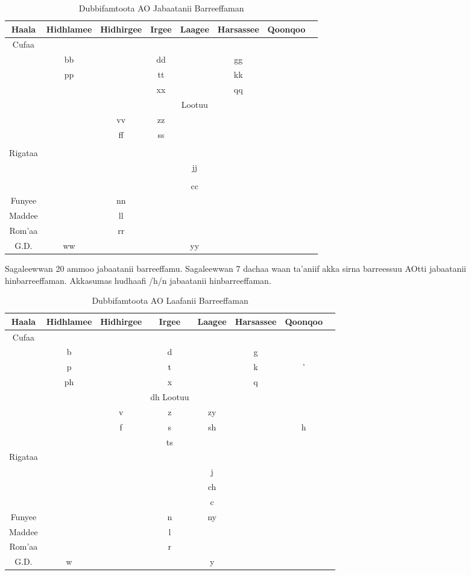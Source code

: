 \documentclass[11pt,b5paper]{book}
\begin{document}
\begin{table}[h!]
	\centering
	\caption{Dubbifamtoota AO Jabaatanii Barreeffaman}
	\begin{tabular}{c |c c c c c c c}
		\hline
		Haala & Hidhlamee & Hidhirgee & Irgee & Laagee & Harsassee & Qoonqoo \\
		\hline
		Cufaa \\
		 & bb & & dd & & gg & & \\
		 & pp & & tt & & kk & & \\
		 & & & xx & & qq & & \\
		 & & & &\cr
		\hline
		Lootuu \\
		 & & vv & zz & & \\
		 &  & ff & ss & & & &  \\
		 & & & &\\
		\hline
		Rigataa \\
		 & & & & jj \\
		 & & & & &\\
		 & & & & cc\\
		\hline
		Funyee & & nn \\
		\hline
		Maddee & & ll\\
		\hline
		Rom'aa & & rr\\
		\hline
		G.D. & ww & & & yy\\
		\hline		
	\end{tabular}
\end{table}

Sagaleewwan 20 ammoo jabaatanii barreeffamu. Sagaleewwan 7 dachaa waan ta'aniif akka sirna barreessuu AOtti jabaatanii hinbarreeffaman. Akkasumas hudhaafi /h/n jabaatanii hinbarreeffaman.

\begin{table}[h!]	
	\caption{Dubbifamtoota AO Laafanii Barreeffaman}
	\begin{tabular}{c c c c c c c c}
		\hline
		Haala & Hidhlamee & Hidhirgee & Irgee & Laagee & Harsassee & Qoonqoo \\
		\hline
		Cufaa \\
		 & b & & d & & g & & \\
		 & p & & t & & k & ' \\
		 & ph & & x & & q & & \\
		 & & & dh\cr
		\hline
		Lootuu \\
		 & & v & z & zy \\
		 &  & f & s & sh & & h\\
		 & & & ts\\
		\hline
		Rigataa \\
		 & & & & j \\
		 & & & & ch\\
		 & & & & c\\
		\hline
		Funyee & & & n & ny\\
		\hline
		Maddee & & & l\\
		\hline
		Rom'aa & & & r\\
		\hline
		G.D. & w & & & y\\
		\hline		
	\end{tabular}
\end{table}
\end{document}
